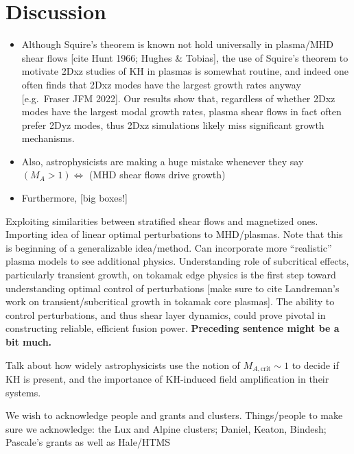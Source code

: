 \documentclass[%
 reprint,
 amsmath,amssymb,
 aps,
]{revtex4-2}
\begin{document}
\section{Discussion}
\begin{itemize}
    \item Although Squire's theorem is known not hold universally in plasma/MHD shear flows [cite Hunt 1966; Hughes \& Tobias], the use of Squire's theorem to motivate 2Dxz studies of KH in plasmas is somewhat routine, and indeed one often finds that 2Dxz modes have the largest growth rates anyway [e.g.~Fraser JFM 2022]. Our results show that, regardless of whether 2Dxz modes have the largest modal growth rates, plasma shear flows in fact often prefer 2Dyz modes, thus 2Dxz simulations likely miss significant growth mechanisms.
    \item Also, astrophysicists are making a huge mistake whenever they say $(M_A > 1) \Leftrightarrow$ (MHD shear flows drive growth)
    \item Furthermore, [big boxes!]
\end{itemize}
Exploiting similarities between stratified shear flows and magnetized ones. Importing idea of linear optimal perturbations to MHD/plasmas. Note that this is beginning of a generalizable idea/method. Can incorporate more ``realistic'' plasma models to see additional physics. Understanding role of subcritical effects, particularly transient growth, on tokamak edge physics is the first step toward understanding optimal control of perturbations [make sure to cite Landreman's work on transient/subcritical growth in tokamak core plasmas]. The ability to control perturbations, and thus shear layer dynamics, could prove pivotal in constructing reliable, efficient fusion power. \textbf{Preceding sentence might be a bit much.}

Talk about how widely astrophysicists use the notion of $M_{A, \mathrm{crit}} \sim 1$ to decide if KH is present, and the importance of KH-induced field amplification in their systems.



\begin{acknowledgments}
We wish to acknowledge people and grants and clusters. Things/people to make sure we acknowledge: the Lux and Alpine clusters; Daniel, Keaton, Bindesh; Pascale's grants as well as Hale/HTMS
\end{acknowledgments}


\end{document}

